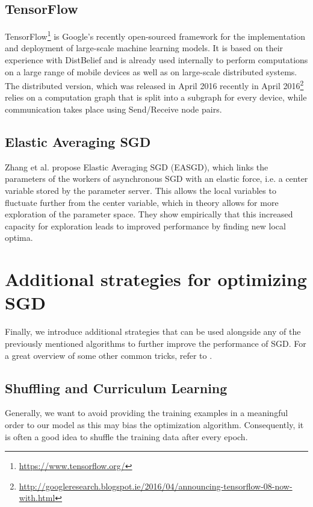 \documentclass{article}
\begin{document}
\subsection{TensorFlow}

TensorFlow\footnote{\url{https://www.tensorflow.org/}} \cite{Abadi2015a} is Google's recently open-sourced framework for the implementation and deployment of large-scale machine learning models. It is based on their experience with DistBelief and is already used internally to perform computations on a large range of mobile devices as well as on large-scale distributed systems. The distributed version, which was released in April 2016 recently in April 2016\footnote{\url{http://googleresearch.blogspot.ie/2016/04/announcing-tensorflow-08-now-with.html}} relies on a computation graph that is split into a subgraph for every device, while communication takes place using Send/Receive node pairs.

\subsection{Elastic Averaging SGD}

Zhang et al. \cite{Zhang2014} propose Elastic Averaging SGD (EASGD), which links the parameters of the workers of asynchronous SGD with an elastic force, i.e. a center variable stored by the parameter server. This allows the local variables to fluctuate further from the center variable, which in theory allows for more exploration of the parameter space. They show empirically that this increased capacity for exploration leads to improved performance by finding new local optima.

\section{Additional strategies for optimizing SGD} \label{sec:strategies}

Finally, we introduce additional strategies that can be used alongside any of the previously mentioned algorithms to further improve the performance of SGD. For a great overview of some other common tricks, refer to \cite{LeCun1998}.

\subsection{Shuffling and Curriculum Learning} \label{sec:shuffling}

Generally, we want to avoid providing the training examples in a meaningful order to our model as this may bias the optimization algorithm. Consequently, it is often a good idea to shuffle the training data after every epoch. 
\end{document}
